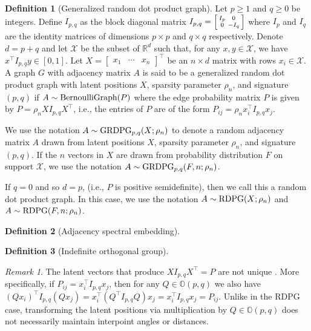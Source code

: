 \documentclass[
  11pt,
]{article}
\theoremstyle{definition}
\newtheorem{definition}{Definition}[section]
\theoremstyle{definition}
\theoremstyle{definition}
\theoremstyle{definition}
\theoremstyle{remark}
\newtheorem*{remark}{Remark}
\begin{document}
\begin{definition}[Generalized random dot product graph]
\label{def:grdpg}
Let $p \geq 1$ and $q \geq 0$ be integers. 
Define $I_{p,q}$ as the block diagonal matrix $I_{p,q} = \Bigl[\begin{smallmatrix} I_{p} & 0 \\ 0 & - I_{q} \end{smallmatrix} \Bigr]$ where $I_p$ and $I_q$ are the identity matrices of dimensions $p \times p$ and $q \times q$ respectively. 
Denote $d = p + q$ and let $\mathcal{X}$ be the subset of $\mathbb{R}^d$ such that, for any $x, y \in \mathcal{X}$, we have $x^\top I_{p,q} y \in [0, 1]$. 
Let $X = \begin{bmatrix} x_1 & \cdots & x_n \end{bmatrix}^\top$ be an $n \times d$ matrix with rows $x_i \in \mathcal{X}$. 
A graph $G$ with adjacency matrix $A$ is said to be a generalized random dot product graph with latent positions $X$, sparsity parameter $\rho_n$, and signature $(p, q)$ if $A \sim \mathrm{BernoulliGraph}(P)$ where the edge probability matrix $P$ is given by $P = \rho_n X I_{p,q} X^\top$, i.e., the entries of $P$ are of the form $P_{ij} = \rho_n x_i^\top I_{p,q} x_j$. 

We use the notation $A \sim \mathrm{GRDPG}_{p,q}(X; \rho_n)$ to denote a random adjacency matrix $A$ drawn from latent positions $X$, sparsity parameter $\rho_n$, and signature $(p, q)$. If the $n$ vectors in $X$ are drawn from probability distribution $F$ on support $\mathcal{X}$, we use the notation $A \sim \mathrm{GRDPG}_{p,q}(F, n; \rho_n)$. 

If $q = 0$ and so $d = p$, (i.e., $P$ is positive semidefinite), then we call this a random dot product graph. 
In this case, we use the notation $A \sim \mathrm{RDPG}(X; \rho_n)$ and $A \sim \mathrm{RDPG}(F, n; \rho_n)$. 
\end{definition}

\begin{definition}[Adjacency spectral embedding]
\label{def:ase}
\end{definition}

\begin{definition}[Indefinite orthogonal group]
\label{def:indef-ortho-group}
\end{definition}

\begin{remark}
\label{rem:non_identifiable}
The latent vectors that produce $X I_{p,q} X^\top = P$ are not unique
\citep{rubindelanchy2017statistical}.
More specifically, if $P_{ij} = x_i^\top I_{p, q} x_j$, then for any $Q \in \mathbb{O}(p, q)$ we also have 
$(Q x_i)^\top I_{p, q} (Q x_j) = x_i^\top (Q^\top I_{p, q} Q) x_j = x_i^\top I_{p, q} x_j = P_{ij}$. 
Unlike in the RDPG case, transforming the latent positions via multiplication by $Q \in \mathbb{O}(p, q)$ does not necessarily maintain interpoint angles or distances.
\end{remark}
\end{document}
